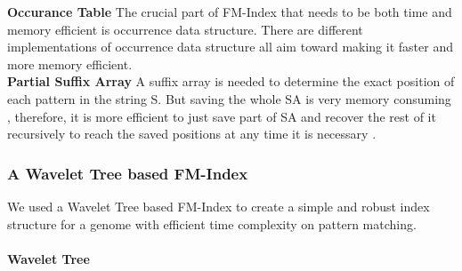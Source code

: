 \documentclass[11pt,a4paper]{report}
\begin{document}
\textbf{Occurance Table} The crucial part of FM-Index that needs to be 
both time and memory efficient is occurrence data structure\cite{Wavthesis}.
There are different implementations of occurrence data structure all aim toward making it faster and more memory efficient.
\\

\textbf{Partial Suffix Array} A suffix array is needed to determine the exact position of each pattern in the string S.
But saving the whole SA is very memory consuming , therefore,
it is more efficient to just save part of SA and recover the rest
of it recursively to reach the saved positions at any time it is necessary \cite{Wavthesis}.\\



\subsubsection{A Wavelet Tree based FM-Index}

We used a Wavelet Tree based FM-Index to create a simple and robust index structure for 
a genome with efficient time complexity on pattern matching.\\
\paragraph{Wavelet Tree}
\end{document}
